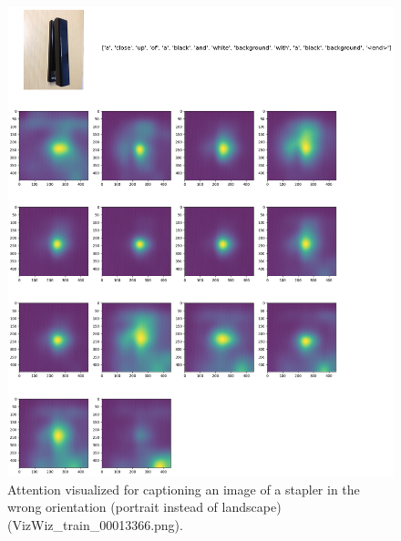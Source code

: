 \documentclass[11pt,a4paper]{article}
\begin{document}
\begin{figure}[t]
  \includegraphics[width=\linewidth]{VizWiz_train_00013366.png}
  \caption{Attention visualized for captioning an image of a stapler in the wrong orientation (portrait instead of landscape)(VizWiz\_train\_00013366.png).}
  \label{fig:stapler}
\end{figure}
\end{document}
